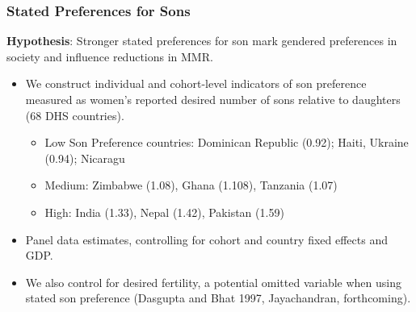\documentclass[9pt,letterpaper,subeqn]{beamer}
\begin{document}
\begin{frame}
\frametitle{Stated Preferences for Sons}
\textbf{Hypothesis}: Stronger stated preferences for son mark gendered preferences in society and influence reductions in MMR.
\vspace{3mm}
\begin{itemize}
\setlength{\itemsep}{15pt}
\item We construct individual and cohort-level indicators of son preference measured as women's reported desired number of sons relative to daughters (68 DHS countries).

\begin{itemize}
\item Low Son Preference countries: Dominican Republic (0.92); Haiti, Ukraine (0.94); Nicaragu%
\item Medium: Zimbabwe (1.08), Ghana (1.108), Tanzania (1.07) 
\item High: India (1.33), Nepal (1.42), Pakistan (1.59)
\end{itemize}
\item Panel data estimates, controlling for cohort and country fixed effects and GDP. 
\item We also control for desired fertility, a potential omitted variable when using stated son preference (Dasgupta and Bhat 1997, Jayachandran, forthcoming).
\end{itemize}
\end{frame}


\end{document}
